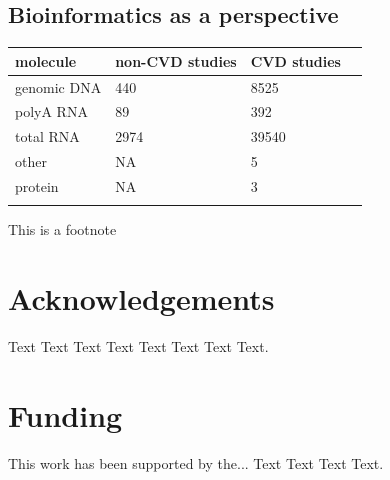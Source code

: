 \documentclass{bioinfo}
\begin{document}
\subsection{Bioinformatics as a perspective}
%
%
\begin{table}[!t]
	 {\begin{tabular}{@{}llll@{}}\toprule 
    molecule &non-CVD studies & CVD studies \\ \midrule
 genomic DNA &            440 &        8525  \\
   polyA RNA &             89 &         392  \\
   total RNA &           2974 &       39540  \\
       other &             NA &           5  \\
     protein &             NA &           3  \\ \botrule
	\end{tabular}}{This is a footnote}
\end{table}


\enlargethispage{12pt}




\section*{Acknowledgements}

Text Text Text Text Text Text  Text Text.  
\vspace*{-12pt}

\section*{Funding}

This work has been supported by the... Text Text  Text Text.\vspace*{-12pt}


%
%
%
%
%
%

\end{document}
